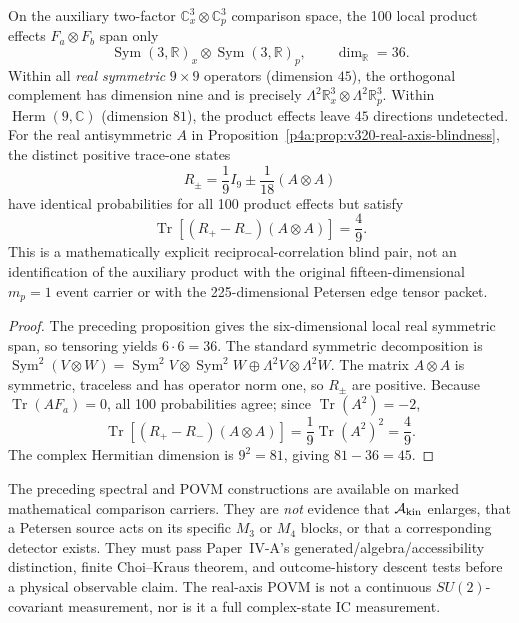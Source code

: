 \documentclass[12pt,a4paper]{article}
\begin{document}
\begin{corollary}
\label{p4a:cor:v320-reciprocal-product-blindness}
On the auxiliary two-factor $\mathbb C^3_x\otimes\mathbb C^3_p$
comparison space, the 100 local product effects $F_a\otimes F_b$
span only
\[
 \operatorname{Sym}(3,\mathbb R)_x\otimes
 \operatorname{Sym}(3,\mathbb R)_p,
 \qquad \dim_{\mathbb R}=36.
\]
Within all \emph{real symmetric} $9\times9$ operators (dimension
$45$), the orthogonal complement has dimension nine and is precisely
$\Lambda^2\mathbb R^3_x\otimes\Lambda^2\mathbb R^3_p$.
Within $\operatorname{Herm}(9,\mathbb C)$ (dimension $81$), the
product effects leave $45$ directions undetected.
For the real antisymmetric $A$ in
Proposition~\ref{p4a:prop:v320-real-axis-blindness}, the distinct
positive trace-one states
\[
 R_\pm=\frac19I_9\pm\frac1{18}(A\otimes A)
\]
have identical probabilities for all 100 product effects but satisfy
\[
 \operatorname{Tr}[(R_+-R_-)(A\otimes A)]=\frac49.
\]
This is a mathematically explicit reciprocal-correlation blind pair,
not an identification of the auxiliary product with the original
fifteen-dimensional $m_p=1$ event carrier or with the 225-dimensional
Petersen edge tensor packet.
\end{corollary}
\begin{proof}
The preceding proposition gives the six-dimensional local real
symmetric span, so tensoring yields $6\cdot6=36$. The standard
symmetric decomposition is
$\operatorname{Sym}^2(V\otimes W)
=\operatorname{Sym}^2V\otimes\operatorname{Sym}^2W
\oplus\Lambda^2V\otimes\Lambda^2W$.
The matrix $A\otimes A$ is symmetric, traceless and has operator norm
one, so $R_\pm$ are positive. Because $\operatorname{Tr}(AF_a)=0$,
all 100 probabilities agree; since $\operatorname{Tr}(A^2)=-2$,
\[\operatorname{Tr}[(R_+-R_-)(A\otimes A)]
 =\frac19\operatorname{Tr}(A^2)^2=\frac49.\]
The complex Hermitian dimension is $9^2=81$, giving $81-36=45$.
\end{proof}

\begin{remark}
\label{p4a:rem:v320-petersen-events-firewall}
The preceding spectral and POVM constructions are available on marked
mathematical comparison carriers. They are \emph{not} evidence that
$\mathcal A_{\rm kin}$ enlarges, that a Petersen source acts on its
specific $M_3$ or $M_4$ blocks, or that a corresponding detector exists.
They must pass Paper~IV-A's generated/algebra/accessibility distinction,
finite Choi--Kraus theorem, and outcome-history descent tests before a
physical observable claim. The real-axis POVM is not a continuous
$SU(2)$-covariant measurement, nor is it a full complex-state IC
measurement.
\end{remark}
\end{document}
